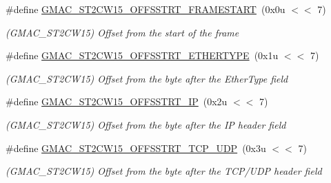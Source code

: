 \begin{DoxyCompactItemize}
\item 
\mbox{\label{group__SAME70__GMAC_gac98fe4c5bcbe2e8a1f627d4589ebddf6}} 
\#define \mbox{\hyperlink{group__SAME70__GMAC_gac98fe4c5bcbe2e8a1f627d4589ebddf6}{G\+M\+A\+C\+\_\+\+S\+T2\+C\+W15\+\_\+\+O\+F\+F\+S\+S\+T\+R\+T\+\_\+\+F\+R\+A\+M\+E\+S\+T\+A\+RT}}~(0x0u $<$$<$ 7)
\begin{DoxyCompactList}\small\item\em (G\+M\+A\+C\+\_\+\+S\+T2\+C\+W15) Offset from the start of the frame \end{DoxyCompactList}\item 
\mbox{\label{group__SAME70__GMAC_ga46e49d4735f7b10fbfe59d5f5e98fc2d}} 
\#define \mbox{\hyperlink{group__SAME70__GMAC_ga46e49d4735f7b10fbfe59d5f5e98fc2d}{G\+M\+A\+C\+\_\+\+S\+T2\+C\+W15\+\_\+\+O\+F\+F\+S\+S\+T\+R\+T\+\_\+\+E\+T\+H\+E\+R\+T\+Y\+PE}}~(0x1u $<$$<$ 7)
\begin{DoxyCompactList}\small\item\em (G\+M\+A\+C\+\_\+\+S\+T2\+C\+W15) Offset from the byte after the Ether\+Type field \end{DoxyCompactList}\item 
\mbox{\label{group__SAME70__GMAC_ga6fe7a3c1c257b8764c0abd8112e6f656}} 
\#define \mbox{\hyperlink{group__SAME70__GMAC_ga6fe7a3c1c257b8764c0abd8112e6f656}{G\+M\+A\+C\+\_\+\+S\+T2\+C\+W15\+\_\+\+O\+F\+F\+S\+S\+T\+R\+T\+\_\+\+IP}}~(0x2u $<$$<$ 7)
\begin{DoxyCompactList}\small\item\em (G\+M\+A\+C\+\_\+\+S\+T2\+C\+W15) Offset from the byte after the IP header field \end{DoxyCompactList}\item 
\mbox{\label{group__SAME70__GMAC_ga807bc6f0619c7afb33746d81aa88f5d7}} 
\#define \mbox{\hyperlink{group__SAME70__GMAC_ga807bc6f0619c7afb33746d81aa88f5d7}{G\+M\+A\+C\+\_\+\+S\+T2\+C\+W15\+\_\+\+O\+F\+F\+S\+S\+T\+R\+T\+\_\+\+T\+C\+P\+\_\+\+U\+DP}}~(0x3u $<$$<$ 7)
\begin{DoxyCompactList}\small\item\em (G\+M\+A\+C\+\_\+\+S\+T2\+C\+W15) Offset from the byte after the T\+C\+P/\+U\+DP header field \end{DoxyCompactList}\item 
\mbox{\label{group__SAME70__GMAC_ga8f06923bbc78f6262a61f6b96697ea74}} 

\end{DoxyCompactItemize}
